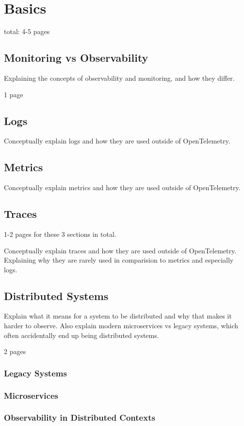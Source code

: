 \chapter{Basics}
\label{chap:basics}

total: 4-5 pages

\section{Monitoring vs Observability}
\label{sec:b_monitoring_vs_observability}

Explaining the concepts of observability and monitoring, and how they differ.

1 page

\section{Logs}
\label{sec_b_logs}

Conceptually explain logs and how they are used outside of OpenTelemetry.

\section{Metrics}
\label{sec_b_metrics}

Conceptually explain metrics and how they are used outside of OpenTelemetry.

\section{Traces}
\label{sec_b_traces}

1-2 pages for these 3 sections in total.

Conceptually explain traces and how they are used outside of OpenTelemetry.
Explaining why they are rarely used in comparision to metrics and especially logs.

\section{Distributed Systems}
\label{sec_b_distributed_systems}

Explain what it means for a system to be distributed and why that makes it harder to observe.
Also explain modern microservices vs legacy systems, which often accidentally end up being distributed systems.

2 pages

\subsection{Legacy Systems}
\subsection{Microservices}
\subsection{Observability in Distributed Contexts}